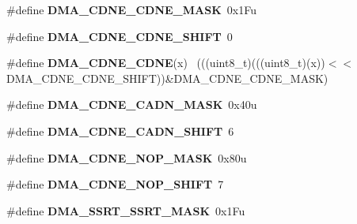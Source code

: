 \begin{DoxyCompactItemize}
\item 
\hypertarget{group___d_m_a___register___masks_ga42965bab0b0f5b27c28045c06f43d43d}{}\#define {\bfseries D\+M\+A\+\_\+\+C\+D\+N\+E\+\_\+\+C\+D\+N\+E\+\_\+\+M\+A\+S\+K}~0x1\+Fu\label{group___d_m_a___register___masks_ga42965bab0b0f5b27c28045c06f43d43d}

\item 
\hypertarget{group___d_m_a___register___masks_ga4993325bdeae286074e4e8eace0e19ef}{}\#define {\bfseries D\+M\+A\+\_\+\+C\+D\+N\+E\+\_\+\+C\+D\+N\+E\+\_\+\+S\+H\+I\+F\+T}~0\label{group___d_m_a___register___masks_ga4993325bdeae286074e4e8eace0e19ef}

\item 
\hypertarget{group___d_m_a___register___masks_ga66de4b4b88a6776774cec4ede7c91a1f}{}\#define {\bfseries D\+M\+A\+\_\+\+C\+D\+N\+E\+\_\+\+C\+D\+N\+E}(x)                                              ~(((uint8\+\_\+t)(((uint8\+\_\+t)(x))$<$$<$D\+M\+A\+\_\+\+C\+D\+N\+E\+\_\+\+C\+D\+N\+E\+\_\+\+S\+H\+I\+F\+T))\&D\+M\+A\+\_\+\+C\+D\+N\+E\+\_\+\+C\+D\+N\+E\+\_\+\+M\+A\+S\+K)\label{group___d_m_a___register___masks_ga66de4b4b88a6776774cec4ede7c91a1f}

\item 
\hypertarget{group___d_m_a___register___masks_gae1c134ccb3874e42a53d9294e1b1366c}{}\#define {\bfseries D\+M\+A\+\_\+\+C\+D\+N\+E\+\_\+\+C\+A\+D\+N\+\_\+\+M\+A\+S\+K}~0x40u\label{group___d_m_a___register___masks_gae1c134ccb3874e42a53d9294e1b1366c}

\item 
\hypertarget{group___d_m_a___register___masks_ga45fa14dce342a18cb1ea15705a772671}{}\#define {\bfseries D\+M\+A\+\_\+\+C\+D\+N\+E\+\_\+\+C\+A\+D\+N\+\_\+\+S\+H\+I\+F\+T}~6\label{group___d_m_a___register___masks_ga45fa14dce342a18cb1ea15705a772671}

\item 
\hypertarget{group___d_m_a___register___masks_ga8f22bcbf69b1598d53d60b7667079655}{}\#define {\bfseries D\+M\+A\+\_\+\+C\+D\+N\+E\+\_\+\+N\+O\+P\+\_\+\+M\+A\+S\+K}~0x80u\label{group___d_m_a___register___masks_ga8f22bcbf69b1598d53d60b7667079655}

\item 
\hypertarget{group___d_m_a___register___masks_gaa6e57536846087bab95bfb2f8895f626}{}\#define {\bfseries D\+M\+A\+\_\+\+C\+D\+N\+E\+\_\+\+N\+O\+P\+\_\+\+S\+H\+I\+F\+T}~7\label{group___d_m_a___register___masks_gaa6e57536846087bab95bfb2f8895f626}

\item 
\hypertarget{group___d_m_a___register___masks_gad3b3959cb4d1e1db5bbb4cc6291a0390}{}\#define {\bfseries D\+M\+A\+\_\+\+S\+S\+R\+T\+\_\+\+S\+S\+R\+T\+\_\+\+M\+A\+S\+K}~0x1\+Fu\label{group___d_m_a___register___masks_gad3b3959cb4d1e1db5bbb4cc6291a0390}


\end{DoxyCompactItemize}
